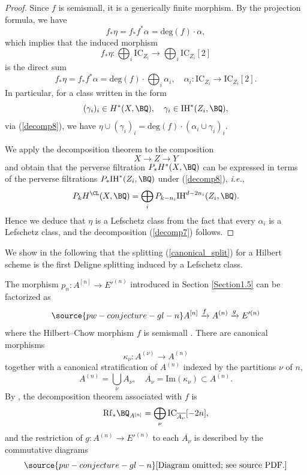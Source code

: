 \begin{proof}
Since $f$ is semismall, it is a generically finite morphism. By the projection formula, we have
\[
f_\ast \eta = f_*f^* \alpha = \mathrm{deg}(f)\cdot  \alpha,
\]
which implies that the induced morphism
\[
f_\ast \eta: \bigoplus_i \mathrm{IC}_{Z_i} \to \bigoplus_i\mathrm{IC}_{Z_i}[2]
\]
is the direct sum
\[
f_\ast \eta = f_*f^* \alpha = \mathrm{deg}(f) \cdot \bigoplus_i \alpha_i,\quad \alpha_i: \mathrm{IC}_{Z_i} \to \mathrm{IC}_{Z_i}[2].
\]
In particular, for a class written in the form
\[
(\gamma_i)_i \in H^*(X, \BQ), \quad \gamma_i \in \mathrm{IH}^{*}(Z_i, \BQ),
\]
via (\ref{decomp8}), we have $\eta \cup (\gamma_i)_i = \mathrm{deg}(f)\cdot(\alpha_i \cup \gamma_i)_i$.

We apply the decomposition theorem to the composition
\[
X \to Z \to Y
\]
and obtain that the perverse filtration $P_*H^*(X, \BQ)$ can be expressed in terms of the perverse filtrations $P_*\mathrm{IH}^*(Z_i, \BQ)$ under (\ref{decomp8}), \emph{i.e.},
\[
P_kH^\CL(X, \BQ) = \bigoplus_i P_{k-n_i}\mathrm{IH}^{d-2n_i}(Z_i, \BQ).
\]
Hence we deduce that $\eta$ is a Lefschetz class from the fact that every $\alpha_i$ is a Lefschetz class, and the decomposition (\ref{decomp7}) follows.
\end{proof}

We show in the following that the splitting (\ref{canonical_split}) for a Hilbert scheme is the first Deligne splitting induced by a Lefschetz class.

The morphism $p_n: A^{[n]} \to E'^{(n)}$ introduced in Section \ref{Section1.5} can be factorized as
\begin{equation}\label{factorization_Hilb}
\source{pw-conjecture-gl-n}
A^{[n]} \xrightarrow{f} A^{(n)} \xrightarrow{g} E'^{(n)}
\end{equation}
where the Hilbert--Chow morphism $f$ is semismall \cite{Go2}. There are canonical morphisms
\[
\kappa_\nu: A^{(\nu)} \to A^{(n)}
\]
together with a canonical stratification of $A^{(n)}$ indexed by the partitions $\nu$ of $n$,
\[
A^{(n)} = \bigcup_\nu A_\nu, \quad \overline{A_\nu} = \mathrm{Im}(\kappa_\nu) \subset A^{(n)}.
\]
By \cite[Theorem 3]{Go2}, the decomposition theorem associated with $f$ is
\[
\mathrm{Rf}_* \BQ_{A^{[n]}} = \bigoplus_{\nu} \mathrm{IC}_{\overline{A_\nu}} [-2n],
\]
and the restriction of $g: A^{(n)} \to E'^{(n)}$ to each $\overline{A_\nu}$ is described by the commutative diagrams
\begin{equation}\label{diagram9}
\source{pw-conjecture-gl-n}
\text{[Diagram omitted; see source PDF.]}
\end{equation}

